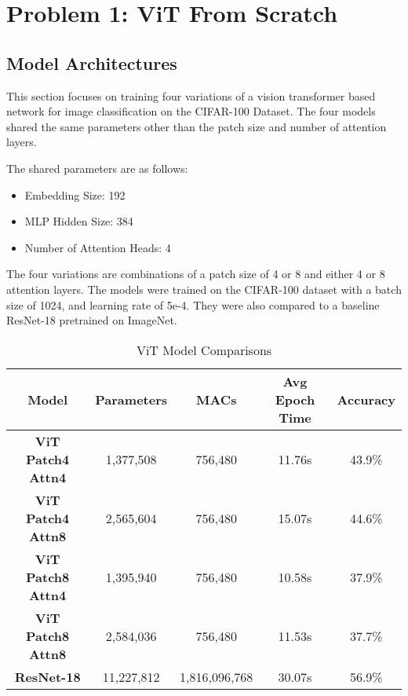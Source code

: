 \documentclass{article}
\begin{document}

\raggedright

\section{Problem 1: ViT From Scratch}
\subsection{Model Architectures}
This section focuses on training four
variations of a vision transformer based
network for image classification on the
CIFAR-100 Dataset. The four models shared the
same parameters other than the patch size and
number of attention layers.

The shared parameters are as follows:
\begin{itemize}
    \item Embedding Size: 192
    \item MLP Hidden Size: 384
    \item Number of Attention Heads: 4
\end{itemize}
The four variations are combinations of a
patch size of 4 or 8 and either 4 or 8
attention layers. The models were trained on
the CIFAR-100 dataset with a batch size of
1024, and learning rate of 5e-4. They were
also compared to a baseline ResNet-18
pretrained on ImageNet. 

\begin{table}[h]
    \centering %
    \begin{tabular}{|c|c|c|c|c|}
        \hline
        \textbf{Model} & \textbf{Parameters} & \textbf{MACs} & \textbf{Avg Epoch Time} & \textbf{Accuracy}  \\
        \hline
        \textbf{ViT Patch4 Attn4} & 1,377,508 & 756,480 & 11.76s & 43.9\% \\
        \hline
        \textbf{ViT Patch4 Attn8} & 2,565,604 & 756,480 & 15.07s & 44.6\% \\
        \hline
        \textbf{ViT Patch8 Attn4} & 1,395,940 & 756,480 & 10.58s & 37.9\% \\
        \hline
        \textbf{ViT Patch8 Attn8} & 2,584,036 & 756,480 & 11.53s & 37.7\% \\
        \hline
        \textbf{ResNet-18} & 11,227,812 & 1,816,096,768 & 30.07s & 56.9\% \\
    \end{tabular}
    \caption{ViT Model Comparisons}
    \label{tab:complexities}
\end{table}
\end{document}
